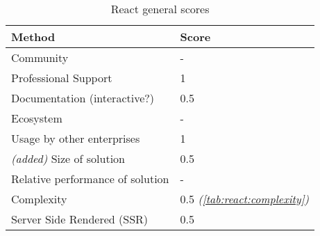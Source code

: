 \begin{table}[H]
    \centering
    \begin{tabular}{|l|l|}
        \hline
        \textbf{Method}                     & \textbf{Score} \\
        \hline
        Community                           & -                                             \\ \hline
        Professional Support                & 1                                             \\ \hline
        Documentation (interactive?)        & 0.5                                           \\ \hline
        Ecosystem                           & -                                             \\ \hline
        Usage by other enterprises          & 1                                             \\ \hline
        \textit{(added)} Size of solution   & 0.5                                           \\ \hline
        Relative performance of solution    & -                                             \\ \hline
        Complexity                          & 0.5 \textit{(\autoref{tab:react:complexity})} \\ \hline
        Server Side Rendered (SSR)          & 0.5                                           \\ \hline
    \end{tabular}
    \caption{React general scores}
    \label{tab:react:scores}
\end{table}